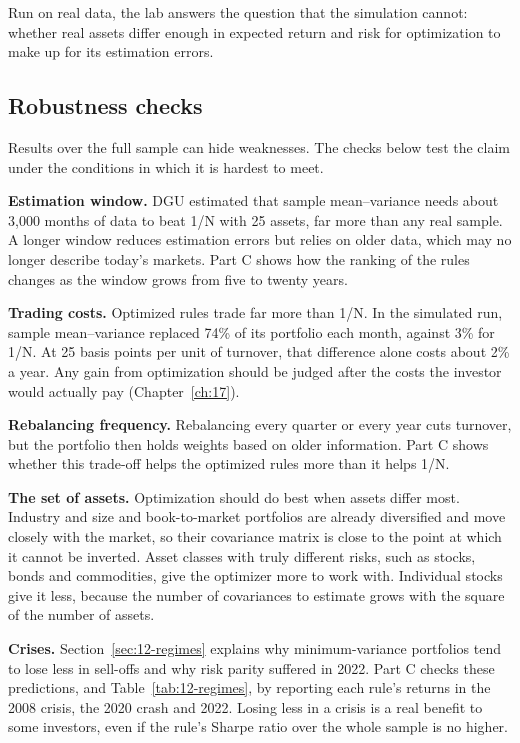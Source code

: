 Run on real data, the lab answers the question that the simulation cannot: whether real assets differ enough in expected return and risk for optimization to make up for its estimation errors.

\subsection{Robustness checks}
\label{sec:12-stress}

Results over the full sample can hide weaknesses. The checks below test the claim under the conditions in which it is hardest to meet.

\textbf{Estimation window.} DGU estimated that sample mean--variance needs about 3,000 months of data to beat 1/N with 25 assets, far more than any real sample. A longer window reduces estimation errors but relies on older data, which may no longer describe today's markets. Part C shows how the ranking of the rules changes as the window grows from five to twenty years.

\textbf{Trading costs.} Optimized rules trade far more than 1/N. In the simulated run, sample mean--variance replaced 74\% of its portfolio each month, against 3\% for 1/N. At 25 basis points per unit of turnover, that difference alone costs about 2\% a year. Any gain from optimization should be judged after the costs the investor would actually pay (Chapter~\ref{ch:17}).

\textbf{Rebalancing frequency.} Rebalancing every quarter or every year cuts turnover, but the portfolio then holds weights based on older information. Part C shows whether this trade-off helps the optimized rules more than it helps 1/N.

\textbf{The set of assets.} Optimization should do best when assets differ most. Industry and size and book-to-market portfolios are already diversified and move closely with the market, so their covariance matrix is close to the point at which it cannot be inverted. Asset classes with truly different risks, such as stocks, bonds and commodities, give the optimizer more to work with. Individual stocks give it less, because the number of covariances to estimate grows with the square of the number of assets.

\textbf{Crises.} Section~\ref{sec:12-regimes} explains why minimum-variance portfolios tend to lose less in sell-offs and why risk parity suffered in 2022. Part C checks these predictions, and Table~\ref{tab:12-regimes}, by reporting each rule's returns in the 2008 crisis, the 2020 crash and 2022. Losing less in a crisis is a real benefit to some investors, even if the rule's Sharpe ratio over the whole sample is no higher.

